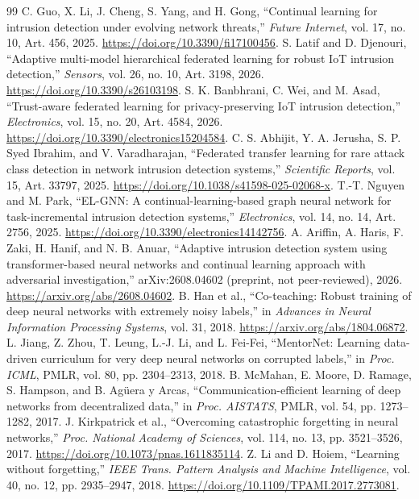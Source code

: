 \documentclass[10pt,a4paper]{article}
\begin{document}
\begin{thebibliography}{99}
 C. Guo, X. Li, J. Cheng, S. Yang, and H. Gong, \enquote{Continual learning for intrusion detection under evolving network threats,} \emph{Future Internet}, vol. 17, no. 10, Art. 456, 2025. \url{https://doi.org/10.3390/fi17100456}.
 S. Latif and D. Djenouri, \enquote{Adaptive multi-model hierarchical federated learning for robust IoT intrusion detection,} \emph{Sensors}, vol. 26, no. 10, Art. 3198, 2026. \url{https://doi.org/10.3390/s26103198}.
 S. K. Banbhrani, C. Wei, and M. Asad, \enquote{Trust-aware federated learning for privacy-preserving IoT intrusion detection,} \emph{Electronics}, vol. 15, no. 20, Art. 4584, 2026. \url{https://doi.org/10.3390/electronics15204584}.
 C. S. Abhijit, Y. A. Jerusha, S. P. Syed Ibrahim, and V. Varadharajan, \enquote{Federated transfer learning for rare attack class detection in network intrusion detection systems,} \emph{Scientific Reports}, vol. 15, Art. 33797, 2025. \url{https://doi.org/10.1038/s41598-025-02068-x}.
 T.-T. Nguyen and M. Park, \enquote{EL-GNN: A continual-learning-based graph neural network for task-incremental intrusion detection systems,} \emph{Electronics}, vol. 14, no. 14, Art. 2756, 2025. \url{https://doi.org/10.3390/electronics14142756}.
 A. Ariffin, A. Haris, F. Zaki, H. Hanif, and N. B. Anuar, \enquote{Adaptive intrusion detection system using transformer-based neural networks and continual learning approach with adversarial investigation,} arXiv:2608.04602 (preprint, not peer-reviewed), 2026. \url{https://arxiv.org/abs/2608.04602}.
 B. Han et al., \enquote{Co-teaching: Robust training of deep neural networks with extremely noisy labels,} in \emph{Advances in Neural Information Processing Systems}, vol. 31, 2018. \url{https://arxiv.org/abs/1804.06872}.
 L. Jiang, Z. Zhou, T. Leung, L.-J. Li, and L. Fei-Fei, \enquote{MentorNet: Learning data-driven curriculum for very deep neural networks on corrupted labels,} in \emph{Proc. ICML}, PMLR, vol. 80, pp. 2304--2313, 2018.
 B. McMahan, E. Moore, D. Ramage, S. Hampson, and B. Ag\"uera y Arcas, \enquote{Communication-efficient learning of deep networks from decentralized data,} in \emph{Proc. AISTATS}, PMLR, vol. 54, pp. 1273--1282, 2017.
 J. Kirkpatrick et al., \enquote{Overcoming catastrophic forgetting in neural networks,} \emph{Proc. National Academy of Sciences}, vol. 114, no. 13, pp. 3521--3526, 2017. \url{https://doi.org/10.1073/pnas.1611835114}.
 Z. Li and D. Hoiem, \enquote{Learning without forgetting,} \emph{IEEE Trans. Pattern Analysis and Machine Intelligence}, vol. 40, no. 12, pp. 2935--2947, 2018. \url{https://doi.org/10.1109/TPAMI.2017.2773081}.

\end{thebibliography}
\end{document}
